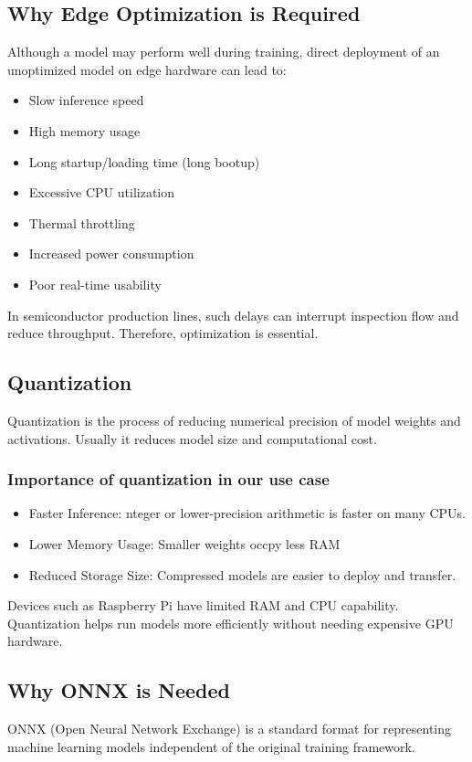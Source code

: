 \subsection{Why Edge Optimization is Required}
Although a model may perform well during training, direct deployment of an unoptimized model on edge hardware can lead to:
\begin{itemize}
    \item Slow inference speed
    \item High memory usage
    \item Long startup/loading time (long bootup)
    \item Excessive CPU utilization
    \item Thermal throttling
    \item Increased power consumption
    \item Poor real-time usability
\end{itemize}
In semiconductor production lines, such delays can interrupt inspection flow and reduce throughput. Therefore, optimization is essential.

\subsection{Quantization}
Quantization is the process of reducing numerical precision of model weights and activations. Usually it reduces model size and computational cost.

\subsubsection{Importance of quantization in our use case}
\begin{itemize}
    \item Faster Inference: nteger or lower-precision arithmetic is faster on many CPUs.
    \item Lower Memory Usage: Smaller weights occpy less RAM
    \item Reduced Storage Size: Compressed models are easier to deploy and transfer.
\end{itemize}

Devices such as Raspberry Pi have limited RAM and CPU capability. Quantization helps run models more efficiently without needing expensive GPU hardware.

\subsection{Why ONNX is Needed}
ONNX (Open Neural Network Exchange) is a standard format for representing machine learning models independent of the original training framework.

